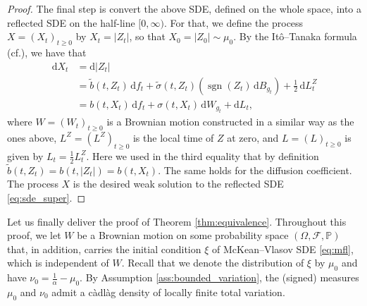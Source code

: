 \documentclass[11pt, a4paper]{article}
\theoremstyle{plain}
\theoremstyle{definition}
\theoremstyle{remark}
\numberwithin{equation}{section}
\DeclareMathOperator{\sgn}{sgn}
\newcommand{\pr}{\mathbb{P}}
\newcommand{\F}{\mathcal{F}}
\renewcommand{\d}{\mathrm{d}}
\begin{document}
\begin{proof}
The final step is convert the above SDE, defined on the whole space, into a reflected SDE on the half-line $[0, \infty)$. For that, we define the process $X = (X_t)_{t \geq 0}$ by $X_t = \lvert Z_t\rvert$, so that $X_0 = \lvert Z_0\rvert \sim \mu_0$. By the It\^o--Tanaka formula (cf.\@ \cite[Chapter 3, Theorem 7.1]{karatzas_bmsc_1998}), we have that
\begin{align*}
    \d X_t &= \d \lvert Z_t\rvert \\
    &= \tilde{b}(t, Z_t) \, \d f_t + \tilde{\sigma}(t, Z_t) (\sgn(Z_t) \, \d B_{g_t}) + \frac{1}{2} \, \d L^Z_t \\
    &= b(t, X_t) \, \d f_t + \sigma(t, X_t) \, \d W_{g_t} + \d L_t,
\end{align*}
where $W = (W_t)_{t \geq 0}$ is a Brownian motion constructed in a similar way as the ones above, $L^Z = (L^Z)_{t \geq 0}$ is the local time of $Z$ at zero, and $L = (L)_{t \geq 0}$ is given by $L_t = \frac{1}{2} L^Z_t$. Here we used in the third equality that by definition $\tilde{b}(t, Z_t) = b(t, \lvert Z_t\rvert) = b(t, X_t)$. The same holds for the diffusion coefficient. The process $X$ is the desired weak solution to the reflected SDE \eqref{eq:sde_super}.
\end{proof}


Let us finally deliver the proof of Theorem \ref{thm:equivalence}. Throughout this proof, we let $W$ be a Brownian motion on some probability space $(\Omega, \F, \pr)$ that, in addition, carries the initial condition $\xi$ of McKean--Vlasov SDE \eqref{eq:mfl}, which is independent of $W$. Recall that we denote the distribution of $\xi$ by $\mu_0$ and have $\nu_0 = \frac{1}{\alpha} - \mu_0$. By Assumption \ref{ass:bounded_variation}, the (signed) measures $\mu_0$ and $\nu_0$ admit a c\`adl\`ag density of locally finite total variation.
\end{document}
